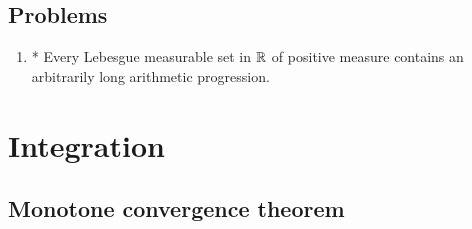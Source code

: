 \documentclass{../../large}
\begin{document}
\begin{prb}
	
\end{prb}


\section*{Problems}
\begin{enumerate}
\item* Every Lebesgue measurable set in $\mathbb{R}$ of positive measure contains an arbitrarily long arithmetic progression.
\end{enumerate}

















\chapter{Integration}



\section{Monotone convergence theorem}


\end{document}
